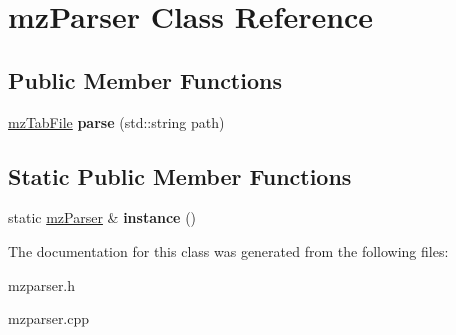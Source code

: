 \hypertarget{classmz_parser}{}\section{mz\+Parser Class Reference}
\label{classmz_parser}
\subsection*{Public Member Functions}
\begin{DoxyCompactItemize}
\item 
\mbox{\label{classmz_parser_aaff07e834a579526b82e86a7bd026d1f}} 
\mbox{\hyperlink{structmz_tab_file}{mz\+Tab\+File}} {\bfseries parse} (std\+::string path)
\end{DoxyCompactItemize}
\subsection*{Static Public Member Functions}
\begin{DoxyCompactItemize}
\item 
\mbox{\label{classmz_parser_a8838850b084cdc867b2b03122de5401b}} 
static \mbox{\hyperlink{classmz_parser}{mz\+Parser}} \& {\bfseries instance} ()
\end{DoxyCompactItemize}


The documentation for this class was generated from the following files\+:\begin{DoxyCompactItemize}
\item 
mzparser.\+h\item 
mzparser.\+cpp\end{DoxyCompactItemize}
